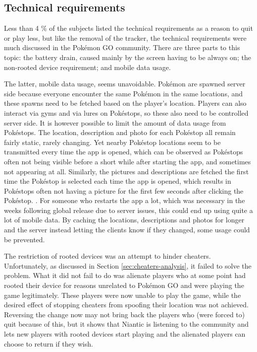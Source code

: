 \subsection{Technical requirements}
\label{sec:quitting-reasons-technical-requirements}
Less than 4 \% of the subjects listed the technical requirements as a reason to quit or play less, but like the removal of the tracker, the technical requirements were much discussed in the Pokémon GO community. There are three parts to this topic: the battery drain, caused mainly by the screen having to be always on; the non-rooted device requirement; and mobile data usage.

The latter, mobile data usage, seems unavoidable. Pokémon are spawned server side because everyone encounter the same Pokémon in the same locations, and these spawns need to be fetched based on the player's location. Players can also interact via gyms and via lures on Pokéstops, so these also need to be controlled server side. It is however possible to limit the amount of data usage from Pokéstops. The location, description and photo for each Pokéstop all remain fairly static, rarely changing. Yet nearby Pokéstop locations seem to be transmitted every time the app is opened, which can be observed as Pokéstops often not being visible before a short while after starting the app, and sometimes not appearing at all. Similarly, the pictures and descriptions are fetched the first time the Pokéstop is selected each time the app is opened, which results in Pokéstops often not having a picture for the first few seconds after clicking the Pokéstop. . For someone who restarts the app a lot, which was necessary in the weeks following global release due to server issues, this could end up using quite a lot of mobile data. By caching the locations, descriptions and photos for longer and the server instead letting the clients know if they changed, some usage could be prevented.

The restriction of rooted devices was an attempt to hinder cheaters. Unfortunately, as discussed in Section \ref{sec:cheaters-analysis}, it failed to solve the problem. What it did not fail to do was alienate players who at some point had rooted their device for reasons unrelated to Pokémon GO and were playing the game legitimately. These players were now unable to play the game, while the desired effect of stopping cheaters from spoofing their location was not achieved. Reversing the change now may not bring back the players who (were forced to) quit because of this, but it shows that Niantic is listening to the community and lets new players with rooted devices start playing and the alienated players can choose to return if they wish.

